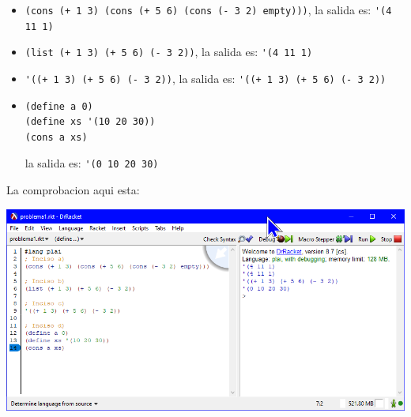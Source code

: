 \documentclass[answers]{exam}
\begin{document}
\begin{questions}


\begin{solution}
  \begin{itemize}
    \item \verb|(cons (+ 1 3) (cons (+ 5 6) (cons (- 3 2) empty)))|, la salida es: \verb|'(4 11 1)|
    \item \verb|(list (+ 1 3) (+ 5 6) (- 3 2))|, la salida es: \verb|'(4 11 1)|
    \item \verb|'((+ 1 3) (+ 5 6) (- 3 2))|, la salida es: \verb|'((+ 1 3) (+ 5 6) (- 3 2))|
    \item \begin{verbatim}
(define a 0) 
(define xs '(10 20 30)) 
(cons a xs)
    \end{verbatim}
    la salida es: \verb|'(0 10 20 30)|
  \end{itemize}

  La comprobacion aqui esta:
    \begin{center}
      \includegraphics[scale=.65]{images/1.png}
    \end{center}
\end{solution}


\end{questions}
\end{document}
